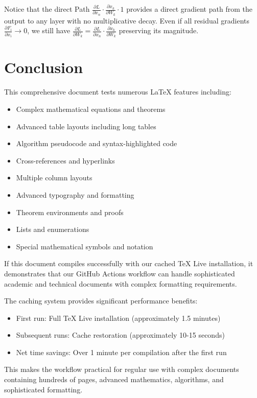 \documentclass[12pt,a4paper,twoside]{article}
\theoremstyle{definition}
\begin{document}
Notice that the direct Path $\frac{\partial L}{\partial x_n} \cdot \frac{\partial x_k}{\partial W_k} \cdot 1$ provides a direct gradient path from the output to any layer with no multiplicative decay. Even if all residual gradients $\frac{\partial F_i}{\partial x_i} \to 0$, we still have
$\frac{\partial L}{\partial W_k} = \frac{\partial L}{\partial x_n} \cdot \frac{\partial x_k}{\partial W_k}$ preserving its magnitude.
\section{Conclusion}

This comprehensive document tests numerous LaTeX features including:
\begin{itemize}
\item Complex mathematical equations and theorems
\item Advanced table layouts including long tables
\item Algorithm pseudocode and syntax-highlighted code
\item Cross-references and hyperlinks
\item Multiple column layouts
\item Advanced typography and formatting
\item Theorem environments and proofs
\item Lists and enumerations
\item Special mathematical symbols and notation
\end{itemize}

If this document compiles successfully with our cached TeX Live installation, it demonstrates that our GitHub Actions workflow can handle sophisticated academic and technical documents with complex formatting requirements.

The caching system provides significant performance benefits:
\begin{itemize}
\item First run: Full TeX Live installation (approximately 1.5 minutes)
\item Subsequent runs: Cache restoration (approximately 10-15 seconds)
\item Net time savings: Over 1 minute per compilation after the first run
\end{itemize}

This makes the workflow practical for regular use with complex documents containing hundreds of pages, advanced mathematics, algorithms, and sophisticated formatting.
\end{document}
